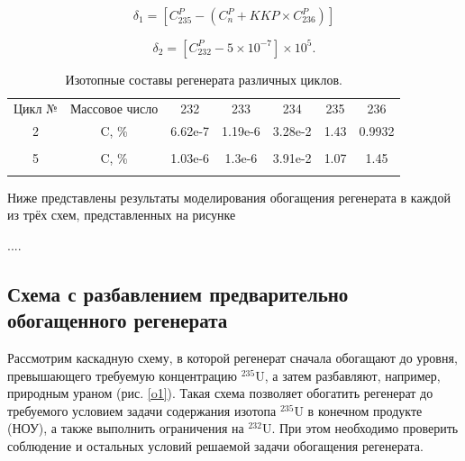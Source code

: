 \begin{equation} \label{d1} 
  \delta_1=\left[C_{235}^P-\left(C_n^P+KKP\times C_{236}^P\right)\right]
\end{equation} 

\begin{equation} \label{d2} 
    \delta_2=\left[C_{232}^P-5\times10^{-7}\right]\times10^5.             
\end{equation}


\begin{table}[h]
  \centering
  \normalsize\begin{tabulary}{1.0\textwidth}{CCCCCCC}
  Цикл № & Массовое число & 232 & 233 & 234 & 235 & 236 \\
  2 & C, \% & 6.62e-7 & 1.19e-6 &    3.28e-2 & 1.43 & 0.9932 \\
   &  &  &  &  &  &  \\
  5 & C, \% &  1.03e-6 &   1.3e-6 &  3.91e-2 & 1.07 & 1.45 \\
   &  &  &  &  &  &  \\
  \end{tabulary}
  \caption{{Изотопные составы регенерата различных циклов.{\label{is_compositions_2_5}}}}
\end{table}


Ниже представлены результаты моделирования обогащения регенерата в каждой из трёх схем, представленных на рисунке 

.... 


\subsection{Схема с разбавлением предварительно обогащенного регенерата}

Рассмотрим каскадную схему, в которой регенерат сначала обогащают до уровня, превышающего требуемую концентрацию $^{235}$U, а затем разбавляют, например, природным ураном (рис. \ref{o1}). Такая схема позволяет обогатить регенерат до требуемого условием задачи содержания изотопа $^{235}$U в конечном продукте (НОУ), а также выполнить ограничения на $^{232}$U. При этом необходимо проверить соблюдение и остальных условий решаемой задачи обогащения регенерата.

